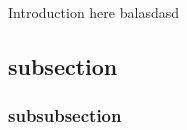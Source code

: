 Introduction here balasdasd
\cite{sundermeyer2021contact}
\cite{kumra2020antipodal}

\subsection{subsection}

\subsubsection{subsubsection}

